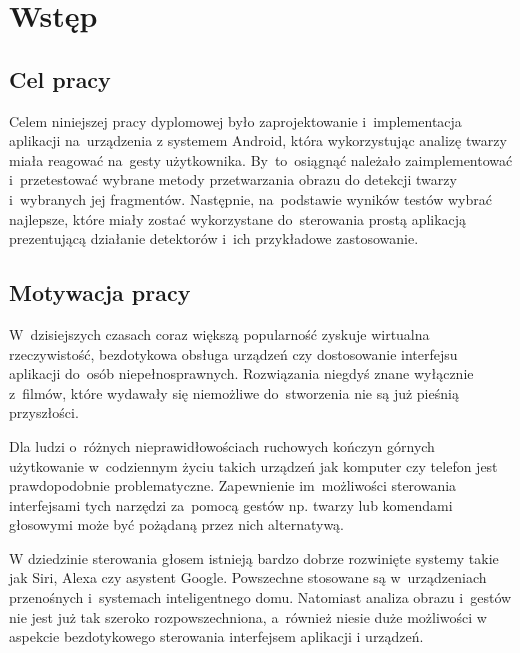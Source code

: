 \newpage

\section{Wstęp}


\subsection{Cel pracy}

Celem niniejszej pracy dyplomowej było zaprojektowanie i~implementacja aplikacji na~urządzenia z systemem Android, która wykorzystując analizę twarzy miała reagować na~gesty użytkownika. By~to~osiągnąć należało zaimplementować i~przetestować wybrane metody przetwarzania obrazu do detekcji twarzy i~wybranych jej fragmentów. Następnie, na~podstawie wyników testów wybrać najlepsze, które miały zostać wykorzystane do~sterowania prostą aplikacją prezentującą działanie detektorów i~ich przykładowe zastosowanie.



\subsection{Motywacja pracy}

W~dzisiejszych czasach coraz większą popularność zyskuje wirtualna rzeczywistość, bezdotykowa obsługa urządzeń czy dostosowanie interfejsu aplikacji do~osób niepełnosprawnych. Rozwiązania niegdyś znane wyłącznie z~filmów, które wydawały się niemożliwe do~stworzenia nie są już pieśnią przyszłości.

\par

Dla ludzi o~różnych nieprawidłowościach ruchowych kończyn górnych użytkowanie w~codziennym życiu takich urządzeń jak komputer czy telefon jest prawdopodobnie problematyczne. Zapewnienie im~możliwości sterowania interfejsami tych narzędzi za~pomocą gestów np. twarzy lub komendami głosowymi może być pożądaną przez nich alternatywą. 

\par

W dziedzinie sterowania głosem istnieją bardzo dobrze rozwinięte systemy takie jak Siri, Alexa czy asystent Google. Powszechne stosowane są w~urządzeniach przenośnych i~systemach inteligentnego domu. Natomiast analiza obrazu i~gestów nie jest już tak szeroko rozpowszechniona, a~również niesie duże możliwości w aspekcie bezdotykowego sterowania interfejsem aplikacji i urządzeń.  

